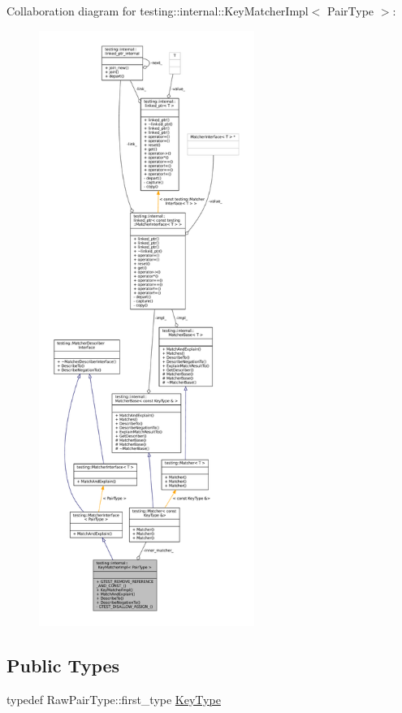 Collaboration diagram for testing\+:\+:internal\+:\+:Key\+Matcher\+Impl$<$ Pair\+Type $>$\+:
\nopagebreak
\begin{figure}[H]
\begin{center}
\leavevmode
\includegraphics[height=550pt]{classtesting_1_1internal_1_1KeyMatcherImpl__coll__graph}
\end{center}
\end{figure}
\subsection*{Public Types}
\begin{DoxyCompactItemize}
\item 
typedef Raw\+Pair\+Type\+::first\+\_\+type \hyperlink{classtesting_1_1internal_1_1KeyMatcherImpl_a9bd63b699518bd9868ba24766547667a}{Key\+Type}
\end{DoxyCompactItemize}
